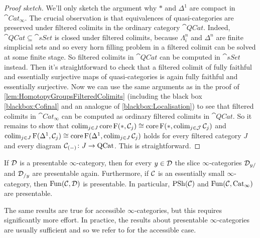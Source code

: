 \begin{proof}[Proof sketch]
	We'll only sketch the argument why $*$ and $\Delta^1$ are compact in $\cat{Cat}_\infty$. The crucial observation is that equivalences of quasi-categories are preserved under filtered colimits in the ordinary category $\cat{QCat}$. Indeed, $\cat{QCat}\subseteq \cat{sSet}$ is closed under filtered colimits, because $\Lambda_i^n$ and $\Delta^n$ are finite simplicial sets and so every horn filling problem in a filtered colimit can be solved at some finite stage. So filtered colimits in $\cat{QCat}$ can be computed in $\cat{sSet}$ instead. Then it's straightforward to check that a filtered colimit of fully faithful and essentially surjective maps of quasi-categories is again fully faithful and essentially surjective. Now we can use the same arguments as in the proof of \cref{lem:HomotopyGroupsFilteredColimits} (including the black box \cref{blackbox:Cofinal} and an analogue of \cref{blackbox:Localisation}) to see that filtered colimits in $\cat{Cat}_\infty$ can be computed as ordinary filtered colimits in $\cat{QCat}$. So it remains to show that $ \operatorname*{colim}_{j\in J}\operatorname{core} \operatorname{F}(*,\mathcal{C}_j)\cong \operatorname{core} \operatorname{F}(*,\operatorname*{colim}_{j\in\mathcal{J}}\mathcal{C}_j)$ and $\operatorname*{colim}_{j\in J}\operatorname{F}(\Delta^1,\mathcal{C}_j)\cong \operatorname{core}\operatorname{F}(\Delta^1,\operatorname*{colim}_{j\in J}\mathcal{C}_j)$ holds for every filtered category $J$ and every diagram $\mathcal{C}_{(-)}\colon J\rightarrow\mathrm{QCat}$. This is straightforward.
\end{proof}
\begin{cor}\label{cor:FunctorCategoriesPresentable}
	If $\mathcal{D}$ is a presentable $\infty$-category, then for every $y\in\mathcal{D}$ the slice $\infty$-categories $\mathcal{D}_{y/}$ and $\mathcal{D}_{/y}$ are presentable again. Furthermore, if $\mathcal{C}$ is an essentially small $\infty$-category, then $\operatorname{Fun}(\mathcal{C},\mathcal{D})$ is presentable. In particular, $\operatorname{PSh}(\mathcal{C})$ and $\operatorname{Fun}(\mathcal{C},\mathrm{Cat}_\infty)$ are presentable.
\end{cor}
The same results are true for accessible $\infty$-categories, but this requires significantly more effort. In practice, the results about presentable $\infty$-categories are usually sufficient and so we refer to \cite[\S\href{https://people.math.harvard.edu/~lurie/papers/HTT.pdf\#section.5.4}{5.4}]{HTT} for the accessible case.
